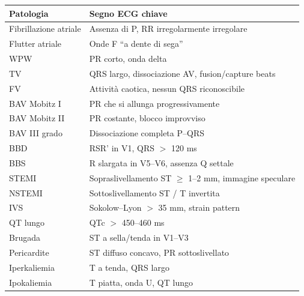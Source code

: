 \documentclass[11pt,a4paper]{article}
\begin{document}
\begin{tabularx}{\textwidth}{@{}l X@{}}
\toprule
\textbf{Patologia} & \textbf{Segno ECG chiave} \\
\midrule
Fibrillazione atriale & Assenza di P, RR irregolarmente irregolare \\
Flutter atriale & Onde F “a dente di sega” \\
WPW & PR corto, onda delta \\
TV & QRS largo, dissociazione AV, fusion/capture beats \\
FV & Attività caotica, nessun QRS riconoscibile \\
BAV Mobitz I & PR che si allunga progressivamente \\
BAV Mobitz II & PR costante, blocco improvviso \\
BAV III grado & Dissociazione completa P--QRS \\
BBD & RSR' in V1, QRS $>$ 120 ms \\
BBS & R slargata in V5--V6, assenza Q settale \\
STEMI & Sopraslivellamento ST $\geq$ 1--2 mm, immagine speculare \\
NSTEMI & Sottoslivellamento ST / T invertita \\
IVS & Sokolow--Lyon $>$ 35 mm, strain pattern \\
QT lungo & QTc $>$ 450--460 ms \\
Brugada & ST a sella/tenda in V1--V3 \\
Pericardite & ST diffuso concavo, PR sottoslivellato \\
Iperkaliemia & T a tenda, QRS largo \\
Ipokaliemia & T piatta, onda U, QT lungo \\
\bottomrule
\end{tabularx}
\end{document}

